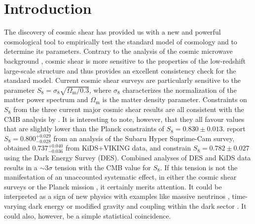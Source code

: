\documentclass{aa}
\renewcommand{\rm}{\mathrm}
\begin{document}
\section{Introduction}
The discovery of cosmic shear has provided us with a new and powerful cosmological tool to empirically test the standard model of cosmology and to determine its parameters. Contrary to the analysis of the cosmic microwave background \citep[CMB, e.g.~by][]{2018arXiv180706209P}, cosmic shear is more sensitive to the properties of the low-redshift large-scale structure and thus provides an excellent consistency check for the standard model. Current cosmic shear surveys are particularly sensitive to the parameter $S_8=\sigma_8 \sqrt{\Omega_{\rm m}/0.3}$, where $\sigma_8$ characterizes the normalization of the matter power spectrum and $\Omega_{\rm m}$ is the matter density parameter. Constraints on $S_8$ from the three current major cosmic shear results are all consistent with the CMB analysis by \citet{2018arXiv180706209P}. It is interesting to note, however, that they all favour values that are slightly lower than the Planck constraints of $S_8 = 0.830 \pm 0.013$. \citet{2018arXiv180909148H} report $S_8 = 0.800^{+0.029}_{-0.028}$ from an analysis of the Subaru Hyper Suprime-Cam survey, \citet[][hereafter H18]{2018arXiv181206076H} obtained $0.737_{-0.036}^{+0.040}$ from KiDS+VIKING data, and \citet{2018PhRvD..98d3528T} constrain $S_8=0.782\pm 0.027$ using the Dark Energy Survey (DES).  Combined analyses of DES and KiDS data \citep{Joudaki:2019, asgari/etal:2019} results in a $\sim 3 \sigma$ tension with the CMB value for $S_8$. If this tension is not the manifestation of an unaccounted systematic effect, in either the cosmic shear surveys \citep{Mandelbaum:2019} or the Planck mission \citep{2016ApJ...818..132A}, it certainly merits attention. It could be interpreted as a sign of new physics with examples like massive neutrinos \citep{2014PhRvL.112e1303B}, time-varying dark energy or modified gravity \citep{2016A&A...594A..14P} and coupling within the dark sector \citep{Kumar:2019}.  It could also, however, be a simple statistical coincidence.
\end{document}
